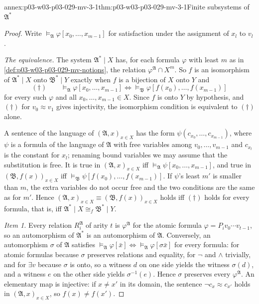 \begin{annexitem}{annex:p03-w03-p03-029-mv-3-1}{thm:p03-w03-p03-029-mv-3-1}{Finite subsystems of \(\mathfrak A^*\)}
\begin{proof}
Write \(\models_{\mathfrak A}\varphi[x_0,\ldots,x_{m-1}]\) for satisfaction
under the assignment of \(x_l\) to \(v_l\).

\emph{The equivalence.} The system \(\mathfrak A^*\mathbin{|}X\) has, for each
formula \(\varphi\) with least \(m\) as in
\cref{def:p03-w03-p03-029-mv-notions}, the relation \(\varphi^{\mathfrak
A}\cap X^m\). So \(f\) is an isomorphism of \(\mathfrak A^*\mathbin{|}X\) onto
\(\mathfrak B^*\mathbin{|}Y\) exactly when \(f\) is a bijection of \(X\) onto
\(Y\) and
\[
  (\dagger)\qquad
  \models_{\mathfrak A}\varphi[x_0,\ldots,x_{m-1}]
  \iff
  \models_{\mathfrak B}\varphi[f(x_0),\ldots,f(x_{m-1})]
\]
for every such \(\varphi\) and all \(x_0,\ldots,x_{m-1}\in X\). Since \(f\) is
onto \(Y\) by hypothesis, and \((\dagger)\) for \(v_0\approx v_1\) gives
injectivity, the isomorphism condition is equivalent to \((\dagger)\) alone.

A sentence of the language of \((\mathfrak A,x)_{x\in X}\) has the form
\(\psi(c_{x_0},\ldots,c_{x_{m-1}})\), where \(\psi\) is a formula of the
language of \(\mathfrak A\) with free variables among \(v_0,\ldots,v_{m-1}\)
and \(c_{x_l}\) is the constant for \(x_l\); renaming bound variables we may
assume that the substitution is free. It is true in
\((\mathfrak A,x)_{x\in X}\) iff \(\models_{\mathfrak
A}\psi[x_0,\ldots,x_{m-1}]\), and true in \((\mathfrak B,f(x))_{x\in X}\) iff
\(\models_{\mathfrak B}\psi[f(x_0),\ldots,f(x_{m-1})]\). If \(\psi\)'s least
\(m'\) is smaller than \(m\), the extra variables do not occur free and the
two conditions are the same as for \(m'\). Hence
\((\mathfrak A,x)_{x\in X}\equiv(\mathfrak B,f(x))_{x\in X}\) holds iff
\((\dagger)\) holds for every formula, that is, iff \(\mathfrak
A^*\mathbin{|}X\cong_f\mathfrak B^*\mathbin{|}Y\).

\emph{Item 1.} Every relation \(R_i^{\mathfrak A}\) of arity \(t\) is
\(\varphi^{\mathfrak A}\) for the atomic formula \(\varphi=P_i
v_0\cdots v_{t-1}\), so an automorphism of \(\mathfrak A^*\) is an
automorphism of \(\mathfrak A\). Conversely, an automorphism \(\sigma\) of
\(\mathfrak A\) satisfies \(\models_{\mathfrak A}\varphi[\bar x]\iff
\models_{\mathfrak A}\varphi[\sigma\bar x]\) for every formula: for atomic
formulas because \(\sigma\) preserves relations and equality, for
\(\neg\) and \(\wedge\) trivially, and for \(\exists v\) because \(\sigma\)
is onto, so a witness \(d\) on one side yields the witness \(\sigma(d)\),
and a witness \(e\) on the other side yields \(\sigma^{-1}(e)\). Hence
\(\sigma\) preserves every \(\varphi^{\mathfrak A}\). An elementary map is
injective: if \(x\neq x'\) in its domain, the sentence
\(\neg c_x\approx c_{x'}\) holds in \((\mathfrak A,x)_{x\in X}\), so
\(f(x)\neq f(x')\).


\end{proof}
\end{annexitem}
